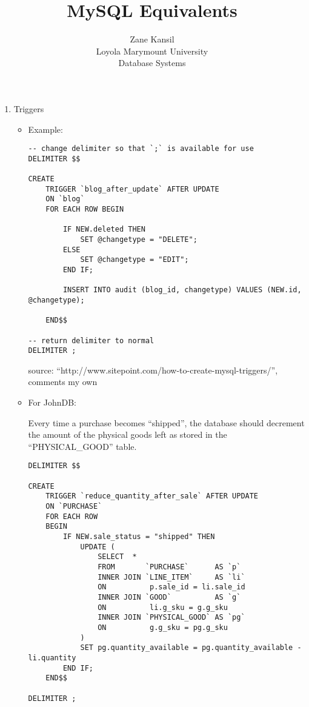 \documentclass[]{article}
\title{MySQL Equivalents}
\author{Zane Kansil\\ Loyola Marymount University\\ Database Systems}
\begin{document}
\maketitle

\begin{enumerate}

\item Triggers
\begin{itemize}
\item Example:
    \begin{verbatim}
-- change delimiter so that `;` is available for use
DELIMITER $$

CREATE
    TRIGGER `blog_after_update` AFTER UPDATE 
    ON `blog` 
    FOR EACH ROW BEGIN
    
        IF NEW.deleted THEN
            SET @changetype = "DELETE";
        ELSE
            SET @changetype = "EDIT";
        END IF;
    
        INSERT INTO audit (blog_id, changetype) VALUES (NEW.id, @changetype);
        
    END$$

-- return delimiter to normal
DELIMITER ;
    \end{verbatim}
source: ``http://www.sitepoint.com/how-to-create-mysql-triggers/'', comments my own

\item For JohnDB:

Every time a purchase becomes ``shipped'', the database should decrement the amount of the physical goods left as stored in the ``PHYSICAL\_GOOD'' table.
    \begin{verbatim}
DELIMITER $$

CREATE
    TRIGGER `reduce_quantity_after_sale` AFTER UPDATE 
    ON `PURCHASE` 
    FOR EACH ROW
    BEGIN
        IF NEW.sale_status = "shipped" THEN
            UPDATE (
                SELECT  *
                FROM       `PURCHASE`      AS `p`
                INNER JOIN `LINE_ITEM`     AS `li`
                ON          p.sale_id = li.sale_id
                INNER JOIN `GOOD`          AS `g`
                ON          li.g_sku = g.g_sku
                INNER JOIN `PHYSICAL_GOOD` AS `pg`
                ON          g.g_sku = pg.g_sku
            )
            SET pg.quantity_available = pg.quantity_available - li.quantity
        END IF;
    END$$

DELIMITER ;
    \end{verbatim}

\end{itemize}



\end{enumerate}
\end{document}

